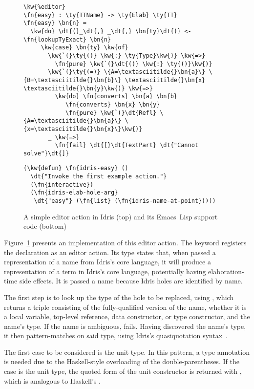 \begin{figure}[b]
\begin{Verbatim}
\kw{%editor}
\fn{easy} : \ty{TTName} -> \ty{Elab} \ty{TT}
\fn{easy} \bn{n} =
  \kw{do} \dt{(}_\dt{,} _\dt{,} \bn{ty}\dt{)} <- \fn{lookupTyExact} \bn{n}
     \kw{case} \bn{ty} \kw{of}
       \kw{`(}\ty{()} \kw{:} \ty{Type}\kw{)} \kw{=>}
         \fn{pure} \kw{`(}\dt{()} \kw{:} \ty{()}\kw{)}
       \kw{`(}\ty{(=)} \{A=\textasciitilde{}\bn{a}\} \{B=\textasciitilde{}\bn{b}\} \textasciitilde{}\bn{x} \textasciitilde{}\bn{y}\kw{)} \kw{=>}
         \kw{do} \fn{converts} \bn{a} \bn{b}
            \fn{converts} \bn{x} \bn{y}
            \fn{pure} \kw{`(}\dt{Refl} \{A=\textasciitilde{}\bn{a}\} \{x=\textasciitilde{}\bn{x}\}\kw{)}
       _ \kw{=>}
         \fn{fail} \dt{[}\dt{TextPart} \dt{"Cannot solve"}\dt{]}
\end{Verbatim}
\hrulefill
\begin{Verbatim}
(\kw{defun} \fn{idris-easy} ()
  \dt{"Invoke the first example action."}
  (\fn{interactive})
  (\fn{idris-elab-hole-arg}
   \dt{"easy"} (\fn{list} (\fn{idris-name-at-point}))))
\end{Verbatim}
  \caption{A simple editor action in Idris (top) and its \mbox{Emacs Lisp} support code (bottom)}
  \label{fig:motivating-example}
\end{figure}

Figure~\ref{fig:motivating-example} presents an implementation of this
editor action. The  keyword registers the declaration as
an editor action. Its type states that, when passed a representation
of a name from Idris's core language, it will produce a representation
of a term in Idris's core language, potentially having
elaboration-time side effects. It is passed a name because Idris holes
are identified by name.

The first step is to look up the type of the hole to be replaced,
using , which returns a triple consisting of the
fully-qualified version of the name, whether it is a local variable,
top-level reference, data constructor, or type constructor, and the
name's type. If the name is ambiguous,  fails.
Having discovered the name's type, it then pattern-matches on said
type, using Idris's quasiquotation syntax~\citep{idrisQuotation}.

The first case to be considered is the unit type. In this pattern, a
type annotation is needed due to the Haskell-style overloading of the
double-parentheses. If the case is the unit type, the quoted form of
the unit constructor is returned with , which is analogous to
Haskell's .

